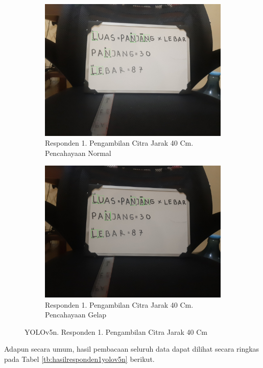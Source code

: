 \begin{figure}[H]
  \begin{subfigure}{.5\textwidth}
    \centering
    \captionsetup{width=.8\linewidth}
    \includegraphics[width=.8\linewidth]{gambar/yolov5n/responden1/dinda40cm00-result.jpg}
    \caption{Responden 1. Pengambilan Citra Jarak 40 Cm. Pencahayaan Normal}
    \label{fig:nr1tcitra40cm}
  \end{subfigure}%
  \begin{subfigure}{.5\textwidth}
    \centering
    \captionsetup{width=.8\linewidth}
    \includegraphics[width=.8\linewidth]{gambar/yolov5n/responden1/dinda40cm10-result.jpg}
    \caption{Responden 1. Pengambilan Citra Jarak 40 Cm. Pencahayaan Gelap}
    \label{fig:nr1gcitra40cm}
  \end{subfigure}
  \caption{YOLOv5n. Responden 1. Pengambilan Citra Jarak 40 Cm}
  \label{fig:nr1citra40cm}
\end{figure}

Adapun secara umum, hasil pembacaan seluruh data dapat dilihat secara ringkas pada Tabel \ref*{tb:hasilresponden1yolov5n} berikut.

